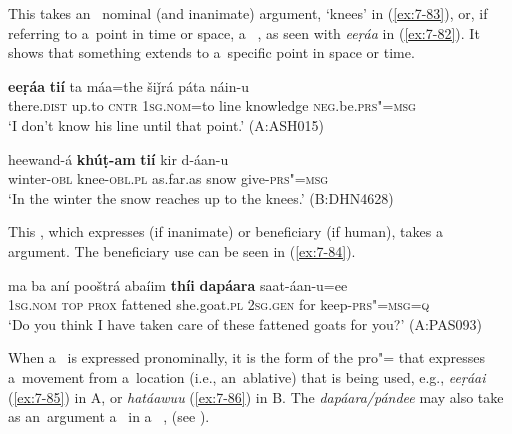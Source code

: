 \begin{exe}
 This  takes an~ nominal (and inanimate) argument, `knees' in (\ref{ex:7-83}), or, if referring to a~point in time or space, a~ , as seen with \textit{eeṛáa} in (\ref{ex:7-82}). It shows that something extends to a~specific point in space or time. 

\begin{exe}
\ex
\label{ex:7-82}
\gll \textbf{eeṛáa} \textbf{tií} ta máa=the šiǰrá páta náin-u \\
there.\textsc{dist} up.to \textsc{cntr} \textsc{1sg.nom}=to line knowledge \textsc{neg}.be.\textsc{prs"=msg} \\
\glt `I don't know his line until that point.' (A:ASH015)
\end{exe}
\begin{exe}
\ex
\label{ex:7-83}
\gll heewand-á \textbf{khúṭ-am} \textbf{tií} kir d-áan-u \\
winter-\textsc{obl} knee-\textsc{obl.pl} as.far.as snow give-\textsc{prs"=msg}  \\
\glt `In the winter the snow reaches up to the knees.' (B:DHN4628)
\end{exe}

 This , which expresses  (if inanimate) or beneficiary (if human), takes a~ argument. The beneficiary use can be seen in (\ref{ex:7-84}).

\begin{exe}
\ex
\label{ex:7-84}
\gll ma ba aní pooštrá abaíim \textbf{thíi} \textbf{dapáara} saat-áan-u=ee\\
\textsc{1sg.nom} \textsc{top} \textsc{prox} fattened she.goat.\textsc{pl} \textsc{2sg.gen} for keep-\textsc{prs"=msg=q}\\
\glt `Do you think I have taken care of these fattened goats for you?' (A:PAS093)
\end{exe}

When a~ is expressed pronominally, it is the form of the pro"= that expresses a~movement from a~location (i.e., an~ablative) that is being used, e.g., \textit{eeṛáai} (\ref{ex:7-85}) in A, or \textit{hatáawuu} (\ref{ex:7-86}) in B. The  \textit{dapáara/pándee} may also take as an~argument a~ in a~ , (see ).


\end{exe}
